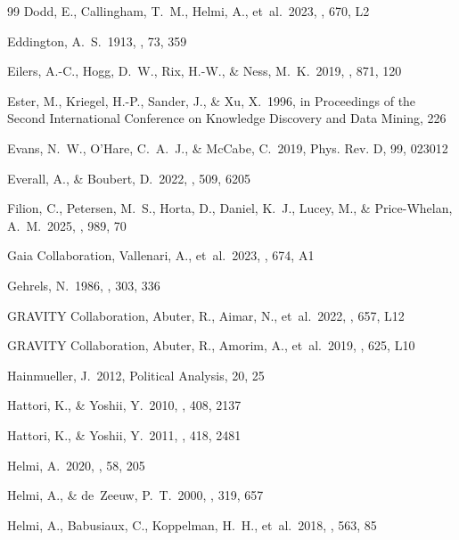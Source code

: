 \documentclass{aa}  %
\begin{document}
\begin{thebibliography}{99}
Dodd, E., Callingham, T.~M., Helmi, A., et~al.\ 2023, \aap, 670, L2

Eddington, A.~S.\ 1913, \mnras, 73, 359

Eilers, A.-C., Hogg, D.~W., Rix, H.-W., \& Ness, M.~K.\ 2019, \apj,
871, 120

Ester, M., Kriegel, H.-P., Sander, J., \& Xu, X.\ 1996, in
Proceedings of the Second International Conference on Knowledge
Discovery and Data Mining, 226

Evans, N.~W., O'Hare, C.~A.~J., \& McCabe, C.\ 2019,
Phys. Rev. D, 99, 023012

Everall, A., \& Boubert, D.\ 2022, \mnras, 509, 6205

Filion, C., Petersen, M.~S., Horta, D., Daniel, K.~J., Lucey, M.,
\& Price-Whelan, A.~M.\ 2025, \apj, 989, 70

Gaia Collaboration, Vallenari, A., et~al.\ 2023, \aap, 674, A1

Gehrels, N.\ 1986, \apj, 303, 336

GRAVITY Collaboration, Abuter, R., Aimar, N., et~al.\ 2022, \aap,
657, L12

GRAVITY Collaboration, Abuter, R., Amorim, A., et~al.\ 2019, \aap,
625, L10

Hainmueller, J.\ 2012, Political Analysis, 20, 25

Hattori, K., \& Yoshii, Y.\ 2010, \mnras, 408, 2137

Hattori, K., \& Yoshii, Y.\ 2011, \mnras, 418, 2481

Helmi, A.\ 2020, \araa, 58, 205

Helmi, A., \& de~Zeeuw, P.~T.\ 2000, \mnras, 319, 657

Helmi, A., Babusiaux, C., Koppelman, H.~H., et~al.\ 2018, \nat, 563,
85


\end{thebibliography}
\end{document}
